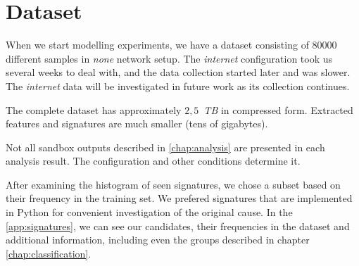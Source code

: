 \section{Dataset}
When we start modelling experiments, we have a dataset consisting of $80000$ different samples in \emph{none} network setup. The \emph{internet} configuration took us several weeks to deal with, and the data collection started later and was slower. The \emph{internet} data will be investigated in future work as its collection continues. 

The complete dataset has approximately $2,5$~\emph{TB} in compressed form. Extracted features and signatures are much smaller (tens of gigabytes). 

Not all sandbox outputs described in \ref{chap:analysis} are presented in each analysis result. The configuration and other conditions determine it.

After examining the histogram of seen signatures, we chose a subset based on their frequency in the training set. We prefered signatures that are implemented in Python for convenient investigation of the original cause. In the \ref{app:signatures}, we can see our candidates, their frequencies in the dataset and additional information, including even the groups described in chapter \ref{chap:classification}.






